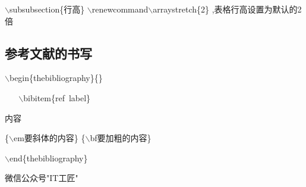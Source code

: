 \documentclass{article}
\begin{document}
$\backslash$subsubsection\{行高\}
$\backslash$renewcommand$\backslash$arraystretch\{2\} ,表格行高设置为默认的2倍



\subsection{参考文献的书写}

$\backslash$begin\{thebibliography\}\{\}

    $\backslash$bibitem\{ref label\}

    内容
    
\{$\backslash$em要斜体的内容\} 
\{$\backslash$bf要加粗的内容\}

$\backslash$end\{thebibliography\}

\begin{thebibliography}{}
微信公众号"IT工匠"
\end{thebibliography} 
\end{document}
